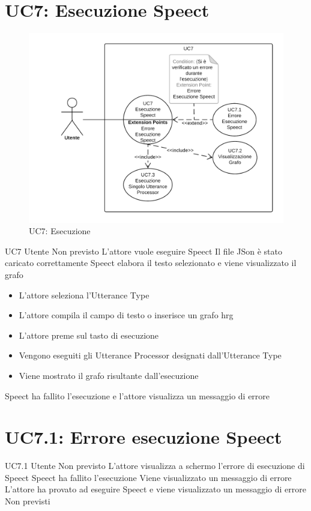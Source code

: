 \documentclass[../AnalisideiRequisiti.tex]{subfiles}
\begin{document}
\section{UC7: Esecuzione Speect}
\begin{figure}[H]
	\centering
	\includegraphics[width=\textwidth]{../img/UC7.png}
	\caption{UC7: Esecuzione}
\end{figure}
\UserCase
{UC7}
{Utente}
{Non previsto}
{L'attore vuole eseguire Speect}
{Il file JSon è stato caricato correttamente }
{Speect elabora il testo selezionato e viene visualizzato il grafo}
{\begin{itemize}
		\item{} L'attore seleziona l'Utterance Type 
		\item{} L'attore compila il campo di testo o inserisce un grafo hrg
		\item{} L'attore preme sul tasto di esecuzione
		\item{} Vengono eseguiti gli Utterance Processor designati dall'Utterance Type 
		\item{} Viene mostrato il grafo risultante dall'esecuzione 
	\end{itemize}
}
{Speect ha fallito l'esecuzione e l'attore visualizza un messaggio di errore }

\section{UC7.1: Errore esecuzione Speect}
\UserCase
{UC7.1}
{Utente}
{Non previsto}
{L'attore visualizza a schermo l'errore di esecuzione di Speect}
{Speect ha fallito l'esecuzione}
{Viene visualizzato un messaggio di errore}
{L'attore ha provato ad eseguire Speect e viene visualizzato un messaggio di errore}
{Non previsti}
\end{document}
